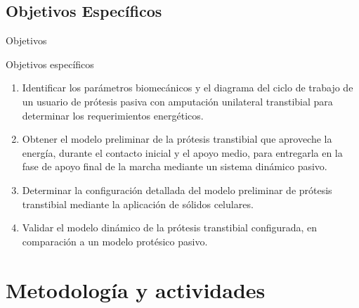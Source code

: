 \documentclass[10pt]{beamer}
\begin{document}
\subsection{Objetivos Específicos}
\begin{frame}{Objetivos}

\begin{exampleblock}{Objetivos específicos}

\begin{enumerate}
\item \small {Identificar los parámetros biomecánicos y el diagrama del ciclo de trabajo de un usuario de prótesis pasiva con amputación unilateral
transtibial para determinar los requerimientos energéticos.}
\item \small{Obtener el modelo preliminar de la prótesis transtibial que
aproveche la energía, durante el contacto inicial y el apoyo medio,
para entregarla en la fase de apoyo final de la marcha mediante un
sistema dinámico pasivo.}
\item \small{Determinar la configuración detallada del modelo preliminar de prótesis transtibial mediante la aplicación de sólidos celulares.} 
\item \small{Validar el modelo dinámico de la prótesis transtibial configurada, en comparación a un modelo protésico pasivo.}
\end{enumerate}
\end{exampleblock}
\end{frame}


\section{Metodología y actividades}
\end{document}

